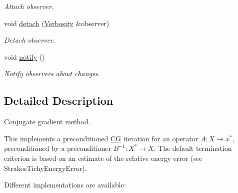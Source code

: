 \begin{DoxyCompactItemize}
\begin{DoxyCompactList}\small\item\em Attach observer. \end{DoxyCompactList}\item 
\hypertarget{classSpacy_1_1Mixin_1_1MixinConnection_adda739590c487679c26f60e50aedb73f}{void \hyperlink{classSpacy_1_1Mixin_1_1MixinConnection_adda739590c487679c26f60e50aedb73f}{detach} (\hyperlink{classSpacy_1_1Mixin_1_1Verbosity_aefe2f237b0456c4bced001fbfa75f92e}{Verbosity} \&observer)}\label{classSpacy_1_1Mixin_1_1MixinConnection_adda739590c487679c26f60e50aedb73f}

\begin{DoxyCompactList}\small\item\em Detach observer. \end{DoxyCompactList}\item 
\hypertarget{classSpacy_1_1Mixin_1_1MixinConnection_a1ddeaa78a3bb4a38c2cca36d1f99fe36}{void \hyperlink{classSpacy_1_1Mixin_1_1MixinConnection_a1ddeaa78a3bb4a38c2cca36d1f99fe36}{notify} ()}\label{classSpacy_1_1Mixin_1_1MixinConnection_a1ddeaa78a3bb4a38c2cca36d1f99fe36}

\begin{DoxyCompactList}\small\item\em Notify observers about changes. \end{DoxyCompactList}\end{DoxyCompactItemize}


\subsection{Detailed Description}
Conjugate gradient method. 

This implements a preconditioned \hyperlink{namespaceSpacy_1_1CG}{C\-G} iteration for an operator $ A: X\to x^* $, preconditioned by a preconditioner $ B^{-1}: X^* \to X $. The default termination criterion is based on an estimate of the relative energy error (see Strakos\-Tichy\-Energy\-Error).

Different implementations are available\-:


